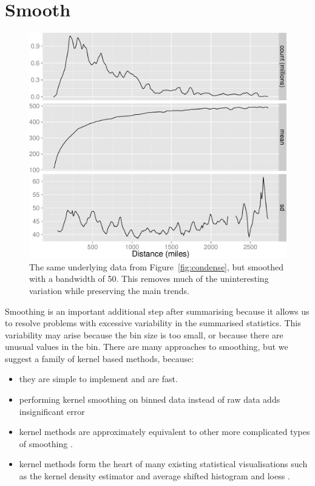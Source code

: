 \documentclass[journal]{vgtc}                %
\begin{document}
\section{Smooth}
\label{sec:smooth}

\begin{figure}[htb]
 \centering
 \includegraphics[width=\linewidth]{smooth}
 \caption{The same underlying data from Figure~\ref{fig:condense}, but smoothed with a bandwidth of 50. This removes much of the uninteresting variation while preserving the main trends.}
 \label{fig:smooth}
\end{figure}

Smoothing is an important additional step after summarising because it allows us to resolve problems with excessive variability in the summarised statistics. This variability may arise because the bin size is too small, or because there are unusual values in the bin. There are many approaches to smoothing, but we suggest a family of kernel based methods, because:

\begin{itemize}
  \item they are simple to implement and are fast.
  
  \item performing kernel smoothing on binned data instead of raw data adds insignificant error \cite{wand:1994} 
  
  \item kernel methods are approximately equivalent to other more complicated types of smoothing \citep{silverman:1984}.
  
  \item kernel methods form the heart of many existing statistical visualisations such as the kernel density estimator \citep{scott:1992} and average shifted histogram \citep{scott:1985} and loess \citep{cleveland:1979}.

\end{itemize}
\end{document}
